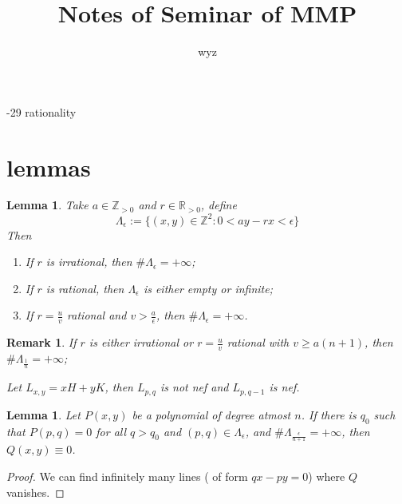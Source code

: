 \documentclass{article}
\title{Notes of Seminar of MMP}
\author{wyz}
\date{}
\newtheorem{lem}[defn]{Lemma}
\newtheorem{rmk}[defn]{Remark}
\begin{document}
	-29 rationality 

\section{lemmas}
\begin{lem}
	Take $ a\in \mathbb{Z}_{>0} $ and $ r\in \mathbb{R}_{>0} $, define 
	$$ \Lambda_\epsilon:=\{ (x,y)\in \mathbb{Z}^2 : 0<ay-rx<\epsilon \} $$
	Then 
	\begin{enumerate}
		\item If $ r $ is irrational, then $ \#\Lambda_{\epsilon} =+\infty$;
		\item If $ r $ is rational, then $ \Lambda_{\epsilon} $ is either empty or infinite;
		\item If $ r=\frac{u}{v} $ rational and $ v> \frac{a}{\epsilon} $, then $ \#\Lambda_{\epsilon} =+\infty$.
	\end{enumerate}
\end{lem}
\begin{rmk}
	If $ r $ is either irrational or $ r=\frac{u}{v} $ rational with $ v\geqslant a(n+1) $, then $ \#\Lambda_{\frac{1}{n}}=+\infty $;
	
	Let $ L_{x,y}=xH+yK $, then $ L_{p,q} $ is not nef and $ L_{p,q-1} $ is nef.
\end{rmk}
\begin{lem}
	Let $ P(x,y) $ be a polynomial of degree atmost $ n $. If there is $ q_0 $ such that $ P(p,q)=0 $ for all $ q>q_0 $ and $ (p,q)\in \Lambda_{\epsilon} $, and $ \#\Lambda_{\frac{\epsilon}{n+1}}=+\infty  $, then $ Q(x,y)\equiv 0 $.
\end{lem}
\begin{proof}
	We can find infinitely many lines ( of form $ qx-py=0 $) where $ Q $ vanishes.
\end{proof}
\end{document}
